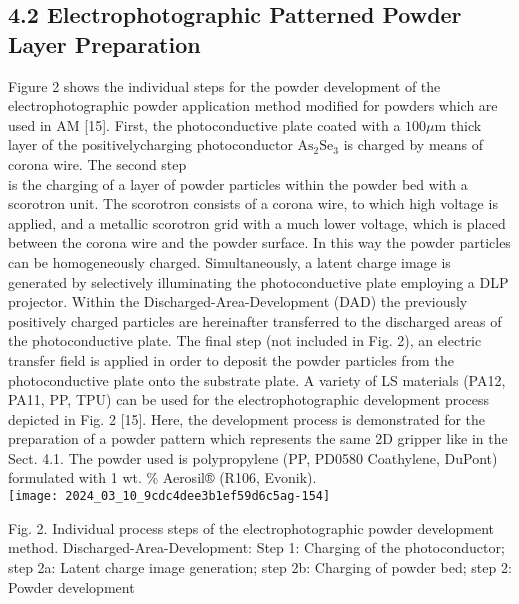 \documentclass[10pt]{article}
\begin{document}
\subsection*{4.2 Electrophotographic Patterned Powder Layer Preparation}
Figure 2 shows the individual steps for the powder development of the electrophotographic powder application method modified for powders which are used in AM [15]. First, the photoconductive plate coated with a $100 \mu \mathrm{m}$ thick layer of the positivelycharging photoconductor $\mathrm{As}_{2} \mathrm{Se}_{3}$ is charged by means of corona wire. The second step\\
is the charging of a layer of powder particles within the powder bed with a scorotron unit. The scorotron consists of a corona wire, to which high voltage is applied, and a metallic scorotron grid with a much lower voltage, which is placed between the corona wire and the powder surface. In this way the powder particles can be homogeneously charged. Simultaneously, a latent charge image is generated by selectively illuminating the photoconductive plate employing a DLP projector. Within the Discharged-Area-Development (DAD) the previously positively charged particles are hereinafter transferred to the discharged areas of the photoconductive plate. The final step (not included in Fig. 2), an electric transfer field is applied in order to deposit the powder particles from the photoconductive plate onto the substrate plate. A variety of LS materials (PA12, PA11, PP, TPU) can be used for the electrophotographic development process depicted in Fig. 2 [15]. Here, the development process is demonstrated for the preparation of a powder pattern which represents the same 2D gripper like in the Sect. 4.1. The powder used is polypropylene (PP, PD0580 Coathylene, DuPont) formulated with 1 wt. \% Aerosil® (R106, Evonik).\\
\texttt{[image: 2024\_03\_10\_9cdc4dee3b1ef59d6c5ag-154]}

Fig. 2. Individual process steps of the electrophotographic powder development method. Discharged-Area-Development: Step 1: Charging of the photoconductor; step 2a: Latent charge image generation; step 2b: Charging of powder bed; step 2: Powder development
\end{document}
